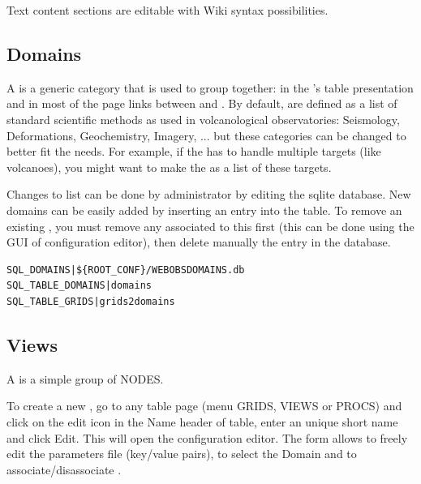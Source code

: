 Text content sections are editable with Wiki syntax possibilities.





\subsection{Domains}
\label{domains}

A  is a generic category that is used to group  together: in the 's table presentation and in most of the page links between  and . By default,  are defined as a list of standard scientific methods as used in volcanological observatories: Seismology, Deformations, Geochemistry, Imagery, ... but these categories can be changed to better fit the \webobs needs. For example, if the \webobs has to handle multiple targets (like volcanoes), you might want to make the  as a list of these targets.

Changes to  list can be done by administrator by editing the sqlite database. New domains can be easily added by inserting an entry into the  table. To remove an existing , you must remove any  associated to this  first (this can be done using the GUI of  configuration editor), then delete manually the entry in the database. 

\begin{lstlisting}[title=\wofile{WEBOBS.rc} (excerpt)]
SQL_DOMAINS|${ROOT_CONF}/WEBOBSDOMAINS.db
SQL_TABLE_DOMAINS|domains
SQL_TABLE_GRIDS|grids2domains
\end{lstlisting}



\subsection{Views}
\label{views}

A  is a simple group of NODES.

To create a new , go to any  table page (menu GRIDS, VIEWS or PROCS) and click on the edit icon in the Name header of table, enter an unique short name and click Edit. This will open the  configuration editor. The form allows to freely edit the parameters file (key/value pairs), to select the Domain and to associate/disassociate .

